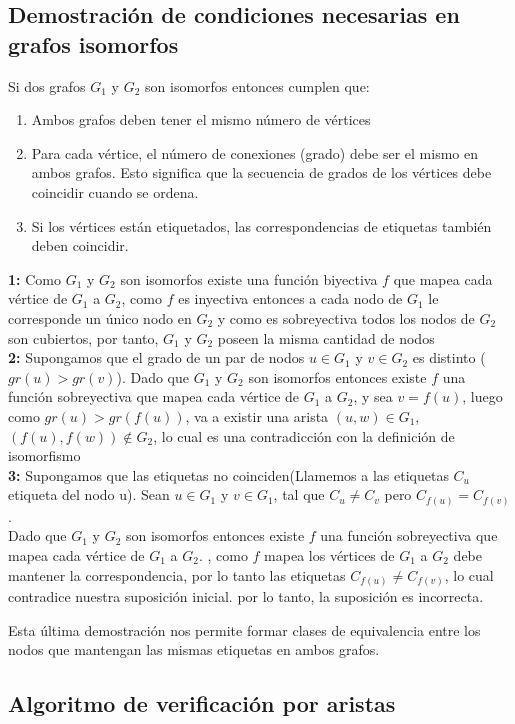 \documentclass{article}
\begin{document}
\subsection{Demostración de condiciones necesarias en grafos isomorfos}
Si dos grafos $G_1$ y $G_2$ son isomorfos entonces cumplen que:
\begin{enumerate}
\item{Ambos grafos deben tener el mismo número de vértices}
\item{Para cada vértice, el número de conexiones (grado) debe ser el mismo en ambos grafos. Esto significa que la secuencia de grados de los vértices debe coincidir cuando se ordena.}
\item{Si los vértices están etiquetados, las correspondencias de etiquetas también deben coincidir.}
\end{enumerate}
\textbf{1:} Como $G_1$ y $G_2$ son isomorfos existe una función biyectiva $f$ que mapea cada vértice de $G_1$ a $G_2$, como $f$ es inyectiva entonces a cada nodo de $G_1$ le corresponde un único nodo en $G_2$ y como es sobreyectiva todos los nodos de $G_2$ son cubiertos, por tanto, $G_1$ y $G_2$ poseen la misma cantidad de nodos\\
\textbf{2:} Supongamos que el grado de un par de nodos $u \in G_1$ y $v \in G_2$ es distinto ($gr(u)>gr(v)$). Dado que $G_1$ y $G_2$ son isomorfos entonces existe $f$ una función sobreyectiva que mapea cada vértice de $G_1$ a $G_2$, y sea 
$v = f(u)$, luego como $gr(u) > gr(f(u))$, va a existir una arista $(u,w) \in G_1$, $(f(u),f(w)) \notin G_2$, lo cual es una contradicción con la definición de isomorfismo\\
\textbf{3:} Supongamos que las etiquetas no coinciden(Llamemos a las etiquetas $C_u$ etiqueta del nodo u). Sean $u \in G_1$ y $v \in G_1$, tal que $C_u \neq C_v$ pero $C_{f(u)} = C_{f(v)}$.\\ Dado que $G_1$ y $G_2$ son isomorfos entonces existe $f$ una función sobreyectiva que mapea cada vértice de $G_1$ a $G_2$. , como $f$ mapea los vértices de $G_1$ a $G_2$ debe mantener la correspondencia, por lo tanto las etiquetas $C_{f(u)} \neq C_{f(v)}$, lo cual contradice nuestra suposición inicial. por lo tanto, la suposición es incorrecta.

Esta última demostración nos permite formar clases de equivalencia entre los nodos que mantengan las mismas etiquetas en ambos grafos.

\subsection{Algoritmo de verificación por aristas}
\end{document}
